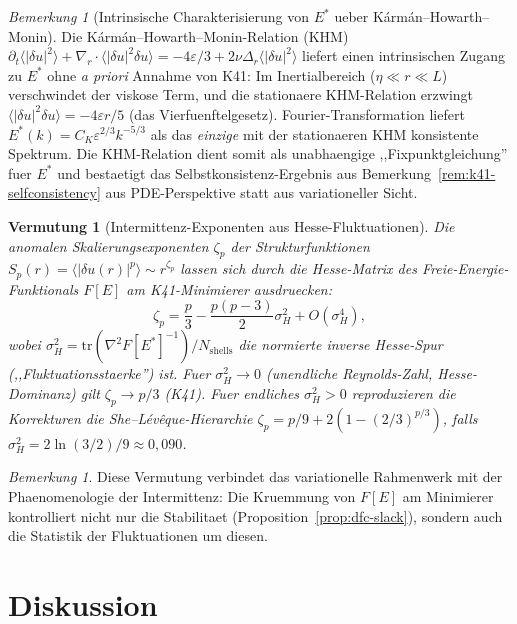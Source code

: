\documentclass[12pt,a4paper]{article}
\theoremstyle{definition}
\theoremstyle{plain}
\newtheorem{conjecture}[definition]{Vermutung}
\theoremstyle{remark}
\newtheorem{remark}[definition]{Bemerkung}
\begin{document}
\begin{remark}[Intrinsische Charakterisierung von $E^*$ ueber K\'arm\'an--Howarth--Monin]
\label{rem:khm-intrinsic}
Die K\'arm\'an--Howarth--Monin-Relation (KHM) $\partial_t \langle |\delta u|^2 \rangle + \nabla_r \cdot \langle |\delta u|^2 \delta u \rangle = -4\varepsilon/3 + 2\nu \Delta_r \langle |\delta u|^2 \rangle$ liefert einen intrinsischen Zugang zu $E^*$ ohne \emph{a priori} Annahme von K41: Im Inertialbereich ($\eta \ll r \ll L$) verschwindet der viskose Term, und die stationaere KHM-Relation erzwingt $\langle |\delta u|^2 \delta u \rangle = -4\varepsilon r / 5$ (das Vierfuenftelgesetz). Fourier-Transformation liefert $E^*(k) = C_K \varepsilon^{2/3} k^{-5/3}$ als das \emph{einzige} mit der stationaeren KHM konsistente Spektrum. Die KHM-Relation dient somit als unabhaengige ,,Fixpunktgleichung'' fuer $E^*$ und bestaetigt das Selbstkonsistenz-Ergebnis aus Bemerkung~\ref{rem:k41-selfconsistency} aus PDE-Perspektive statt aus variationeller Sicht.
\end{remark}

\begin{conjecture}[Intermittenz-Exponenten aus Hesse-Fluktuationen]
\label{conj:intermittency-hessian}
Die anomalen Skalierungsexponenten $\zeta_p$ der Strukturfunktionen $S_p(r) = \langle |\delta u(r)|^p \rangle \sim r^{\zeta_p}$ lassen sich durch die Hesse-Matrix des Freie-Energie-Funktionals $F[E]$ am K41-Minimierer ausdruecken:
\[
\zeta_p = \frac{p}{3} - \frac{p(p-3)}{2} \sigma_H^2 + O(\sigma_H^4),
\]
wobei $\sigma_H^2 = \mathrm{tr}(\nabla^2 F[E^*]^{-1}) / N_{\mathrm{shells}}$ die normierte inverse Hesse-Spur (,,Fluktuationsstaerke'') ist. Fuer $\sigma_H^2 \to 0$ (unendliche Reynolds-Zahl, Hesse-Dominanz) gilt $\zeta_p \to p/3$ (K41). Fuer endliches $\sigma_H^2 > 0$ reproduzieren die Korrekturen die She--L\'ev\^eque-Hierarchie $\zeta_p = p/9 + 2(1 - (2/3)^{p/3})$, falls $\sigma_H^2 = 2\ln(3/2)/9 \approx 0{,}090$.
\end{conjecture}

\begin{remark}
Diese Vermutung verbindet das variationelle Rahmenwerk mit der Phaenomenologie der Intermittenz: Die Kruemmung von $F[E]$ am Minimierer kontrolliert nicht nur die Stabilitaet (Proposition~\ref{prop:dfc-slack}), sondern auch die Statistik der Fluktuationen um diesen.
\end{remark}

\section{Diskussion}\label{sec:discussion}
\end{document}
